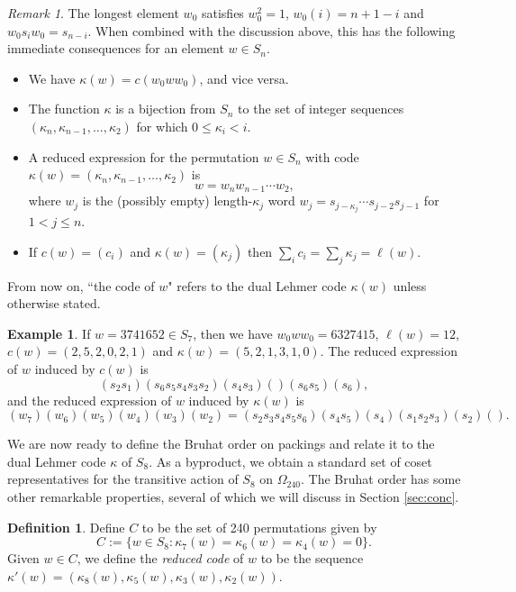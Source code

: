 \documentclass{amsart}
\theoremstyle{plain}
\theoremstyle{definition}
\newtheorem{defn}[theorem]{Definition}
\newtheorem{exa}[theorem]{Example}
\theoremstyle{remark}
\newtheorem{rmk}[theorem]{Remark}
\numberwithin{equation}{section}
\newcommand{\qpx}{\Omega_{240}}
\newcommand{\leh}{\kappa}
\begin{document}
\begin{rmk}\label{rmk:redexp}
The longest element $w_0$ satisfies $w_0^2 = 1$, $w_0(i)=n+1-i$ and $w_0 s_i w_0 = s_{n-i}$. When combined with
the discussion above, this has the following immediate consequences for an element $w \in S_n$.
\begin{itemize}
\item[(i)]{We have $\leh(w) = c(w_0 w w_0)$, and vice versa.}
\item[(ii)]{The function $\leh$ is a bijection from $S_n$ to the set of integer sequences 
$(\leh_n, \leh_{n-1}, \ldots, \leh_2)$ for which $0 \leq \leh_i < i$.}
\item[(iii)]{A reduced expression for 
the permutation $w \in S_n$ with code $\leh(w) = (\leh_n, \leh_{n-1}, \ldots, \leh_2)$ is $$
w = w_n w_{n-1} \cdots w_2
,$$ where $w_j$ is the (possibly empty) length-$\leh_j$ word $w_j = s_{j - \leh_j} \cdots s_{j-2} s_{j-1}$ 
for $1 < j \leq n$.}
\item[(iv)]{If $c(w) = (c_i)$ and $\leh(w) = (\leh_j)$ then $\sum_i c_i = \sum_j \leh_j = \ell(w)$.}
\end{itemize}
\end{rmk}

From now on, ``the code of $w$" refers to the dual Lehmer code $\leh(w)$ unless otherwise stated.

\begin{exa}\label{exa:code}
If $w = 3741652 \in S_7$, then we have $w_0 w w_0 = 6327415$, $\ell(w) = 12$, $c(w) = (2, 5, 2, 0, 2, 1)$ 
and $\leh(w) = (5, 2, 1, 3, 1, 0)$. The reduced expression of $w$ induced by $c(w)$ is $$
(s_2 s_1)(s_6 s_5 s_4 s_3 s_2)(s_4 s_3)()(s_6 s_5)(s_6)
,$$ and the reduced expression of $w$ induced by $\leh(w)$ is $$
(w_7)(w_6)(w_5)(w_4)(w_3)(w_2) = (s_2 s_3 s_4 s_5 s_6)(s_4 s_5)(s_4)(s_1 s_2 s_3)(s_2)()
.$$
\end{exa}

We are now ready to define the Bruhat order on packings and relate it to the dual Lehmer code $\leh$
of $S_8$. As a byproduct, we obtain a standard set of coset representatives for the transitive action of
$S_8$ on $\qpx$. The Bruhat order has some other remarkable properties, several of which we will discuss
in Section \ref{sec:conc}.

\begin{defn}\label{def:cset}
Define $C$ to be the set of 240 permutations given by $$
C := \{w \in S_8 : \leh_7(w) = \leh_6(w) = \leh_4(w) = 0\}
.$$ Given $w \in C$, we define the {\it reduced code} of $w$ to be the sequence 
$\leh'(w) = (\leh_8(w), \leh_5(w), \leh_3(w), \leh_2(w))$.
\end{defn}
\end{document}

